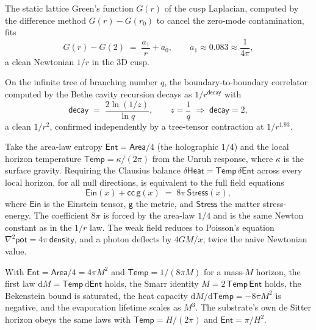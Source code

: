 \begin{result}
The static lattice Green's function $G(r)$ of the cusp Laplacian, computed by the difference method
$G(r) - G(r_0)$ to cancel the zero-mode contamination, fits
\[
G(r) - G(2) \;=\; \frac{a_1}{r} + a_0, \qquad a_1 \approx 0.083 \approx \frac{1}{4\pi},
\]
a clean Newtonian $1/r$ in the $3$D cusp.
\end{result}

\begin{result}
On the infinite tree of branching number $q$, the boundary-to-boundary correlator computed by the Bethe cavity
recursion decays as $1/r^{\mathsf{decay}}$ with
\[
\mathsf{decay} \;=\; \frac{2 \ln(1/z)}{\ln q}, \qquad z = \frac{1}{q} \;\Rightarrow\; \mathsf{decay} = 2,
\]
a clean $1/r^2$, confirmed independently by a tree-tensor contraction at $1/r^{1.93}$.
\end{result}

\begin{result}
Take the area-law entropy $\mathsf{Ent} = \mathsf{Area}/4$ (the holographic $1/4$) and the local horizon
temperature $\mathsf{Temp} = \kappa / (2\pi)$ from the Unruh response, where $\kappa$ is the surface gravity.
Requiring the Clausius balance $\delta\mathsf{Heat} = \mathsf{Temp}\, \delta\mathsf{Ent}$ across every local
horizon, for all null directions, is equivalent to the full field equations
\[
\mathsf{Ein}(x) + \mathsf{cc}\,\mathsf{g}(x) \;=\; 8\pi\, \mathsf{Stress}(x),
\]
where $\mathsf{Ein}$ is the Einstein tensor, $\mathsf{g}$ the metric, and $\mathsf{Stress}$ the matter
stress-energy. The coefficient $8\pi$ is forced by the area-law $1/4$ and is the same Newton constant as in the
$1/r$ law. The weak field reduces to Poisson's equation $\nabla^2 \mathsf{pot} = 4\pi\, \mathsf{density}$, and a
photon deflects by $4 G M / x$, twice the naive Newtonian value.
\end{result}

\begin{result}
With $\mathsf{Ent} = \mathsf{Area}/4 = 4\pi M^2$ and $\mathsf{Temp} = 1/(8\pi M)$ for a mass-$M$ horizon, the
first law $\mathrm{d}M = \mathsf{Temp}\,\mathrm{d}\mathsf{Ent}$ holds, the Smarr identity $M = 2\,\mathsf{Temp}\,
\mathsf{Ent}$ holds, the Bekenstein bound is saturated, the heat capacity $\mathrm{d}M/\mathrm{d}\mathsf{Temp} =
-8\pi M^2$ is negative, and the evaporation lifetime scales as $M^3$. The substrate's own de Sitter horizon obeys
the same laws with $\mathsf{Temp} = H/(2\pi)$ and $\mathsf{Ent} = \pi/H^2$.
\end{result}


